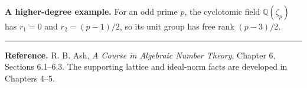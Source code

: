 \documentclass[11pt]{article}
\newcommand{\Q}{\mathbb Q}
\begin{document}
\textbf{A higher-degree example.} For an odd prime $p$, the cyclotomic field $\Q(\zeta_p)$ has $r_1=0$ and $r_2=(p-1)/2$, so its unit group has free rank $(p-3)/2$.

\vspace{2pt}
\noindent\rule{\linewidth}{0.3pt}
{\small\textbf{Reference.} R. B. Ash, \emph{A Course in Algebraic Number Theory}, Chapter 6, Sections 6.1--6.3. The supporting lattice and ideal-norm facts are developed in Chapters 4--5.}
\end{document}
